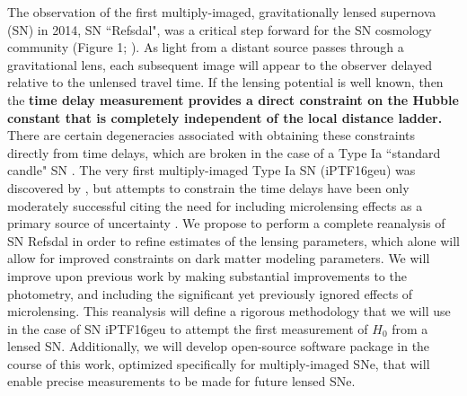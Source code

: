 \forceindent The observation of the first multiply-imaged, gravitationally lensed supernova (SN) in 2014, SN ``Refsdal", 
was a critical step forward for the SN cosmology community (Figure 1; \citet{Kelly:2015a}). As light from a distant
source passes through a gravitational lens, each subsequent image will appear to the observer delayed relative to the 
unlensed travel time. If the lensing potential is well known, then the {\bf time delay measurement  provides a direct constraint on
the Hubble constant that is completely independent of the local distance ladder.} There are certain degeneracies associated with
obtaining these constraints directly from time delays, which are broken in the case of a Type Ia ``standard candle" SN \citep{Kolatt:1998}. The very 
first multiply-imaged Type Ia SN (iPTF16geu) was discovered by \citet{Goobar:2016}, but attempts to constrain the time delays have been 
only moderately successful citing the need for including microlensing effects as a primary source of uncertainty 
\citep{More:2016}. We propose to perform a complete reanalysis of SN Refsdal in order to refine estimates of the lensing parameters, which
alone will allow for improved constraints on dark matter modeling parameters. We will improve upon previous work by 
making substantial improvements to the photometry, and including the significant yet previously ignored effects of microlensing. 
This reanalysis will define a rigorous methodology that we will use in the case of SN iPTF16geu to attempt the first measurement of $H_0$ from a lensed SN. 
Additionally, we will develop open-source software package in the course of this work, optimized specifically for multiply-imaged SNe, that will enable 
precise measurements to be made for future lensed SNe. 


